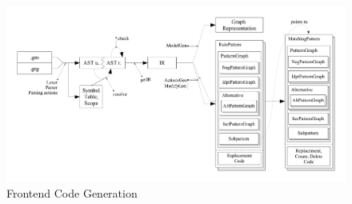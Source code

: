 \begin{figure}[htbp]
  \centering
  \includegraphics[width=\textwidth]{fig/AblaufCodeerzeugungFrontend}
  \caption{Frontend Code Generation}
  \label{figfrontendcodegen}
\end{figure}

